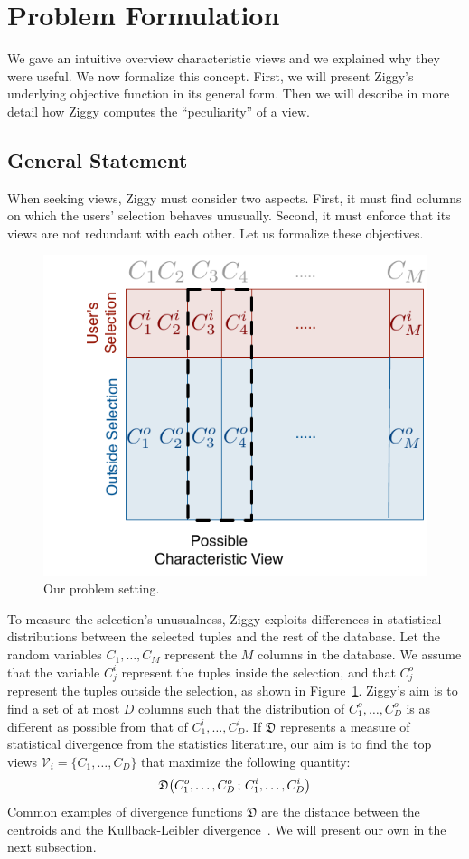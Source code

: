 \section{Problem Formulation}
\label{sec:algorithm}

We gave an intuitive overview characteristic views and we explained why they
were useful. We now formalize this concept. First, we will present Ziggy's
underlying objective function in its general form. Then we will describe in
more detail how Ziggy computes the ``peculiarity'' of a view.

\subsection{General Statement} 
When seeking views, Ziggy must consider two
aspects. First, it must find columns on which the users' selection behaves
unusually. Second, it must enforce that its views are not redundant with each
other. Let us formalize these objectives.

\label{sec:problem}
\begin{figure}[t!]
    \centering
    \includegraphics[width=0.6\columnwidth]{Images/Setting}
    \caption{Our problem setting.}
    \label{fig:setting}
\end{figure}
To measure the selection's unusualness, Ziggy exploits differences in
statistical distributions between the selected tuples and the rest of the
database. Let the random variables $C_1, \ldots, C_M$ represent the $M$ columns
in the database.  We assume that the variable $C_j^i$ represent the tuples
inside the selection, and that $C_j^o$ represent the tuples outside the
selection, as shown in Figure~\ref{fig:setting}. Ziggy's aim is to find a set
of at most $D$ columns such that the distribution of $C_1^o, \ldots, C_D^o$ is
as different as possible from that of $C_1^i, \ldots, C_D^i$. If $\mathfrak{D}$
represents a measure of statistical divergence from the statistics literature,
our aim is to find the top views $\mathcal{V}_i = \{C_1, \ldots, C_D\}$ that
maximize the following quantity:
\begin{equation}
    \label{eq:objective0}
        \mathfrak{D}\big( C_1^o, \ldots, C_D^o \,;\, C_1^i, \ldots, C_D^i \big)\\
\end{equation}
Common examples of divergence functions $\mathfrak{D}$ are the distance between
the centroids and the Kullback-Leibler divergence~\cite{wasserman2013all}.  We
will present our own in the next subsection.

